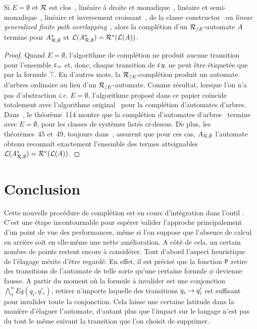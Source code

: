 \begin{theorem}
  \label{thm:regular}
  Si $E=\emptyset$ et $\mathcal R$ est clos~\cite{DauchetTison-LICS90,Brainerd-IC69}, linéaire à droite et
  monadique~\cite{Salomaa88}, linéaire et semi-monadique~\cite{CoquideDauchetGV-FCT89}, linéaire et inversement
  croissant~\cite{Jacquemard-RTA96}, de la classe constructor~\cite{Rety-LPAR99} ou \textit{linear generalized finite path
    overlapping~\cite{Takai-RTA04}}, alors la complétion d'un ${\mathcal R_{/E}}$-automate $\mathit A$ 
  termine pour $\mathit A_{\mathcal R,\emptyset}^*$ et $\mathcal{L}(\mathit A_{\mathcal R,\emptyset}^*)=\mathcal R^*(\mathcal{L}(\mathit A))$.
\end{theorem}

\begin{proof}
  Quand $E=\emptyset$, l'algorithme de complétion ne produit aucune transition
  pour l'ensemble $\upvarepsilon_{=}$ et, donc, chaque transition de $\upvarepsilon_{\mathcal R}$ ne peut être étiquetée 
  que par la formule $\top$. En d'autres mots, la ${\mathcal R_{/E}}$-complétion produit un automate d'arbres
  ordinaire au lieu d'un ${\mathcal R_{/E}}$-automate. Comme résultat, lorsque l'on n'a pas d'abstraction \textit{i.e.} $E=\emptyset$,
  l'algorithme proposé dans ce papier coïncide totalement avec l'algorithme original~\cite{GenetR-JSC10} 
  pour la complétion d'automates d'arbres. Dans~\cite{Genet-Habil}, le théorème~114 montre que
  la complétion d'automates d'arbres~\cite{GenetR-JSC10} termine avec $E=\emptyset$,
  pour les classes de systèmes listés ci-dessus. De plus, les théorèmes~45 et~49, toujours
  dans~\cite{GenetR-JSC10}, assurent que pour ces cas, $A_{\mathcal R,\emptyset}$ l'automate obtenu
  reconnaît exactement l'ensemble des termes atteignables $\mathcal{L}(\mathit A_{\mathcal R,\emptyset}^*)=\mathcal R^*(\mathcal{L}(\mathit A))$.
\end{proof}

\section{Conclusion}
Cette nouvelle procédure de complétion est en cours d'intégration dans l'outil \timbuk.
C'est une étape incontournable pour espérer valider l'approche principalement d'un point
de vue des performances, même si l'on suppose que l'absence de calcul en arrière soit
en elle-même une nette amélioration. A côté de cela, un certain nombre de points
restent encore à considérer.
Tout d'abord l'aspect heuristique de l'élagage mérite d'être regardé. En effet, 
il est précisé que la fonction $\mathtt{P}$ retire des transitions de l'automate de telle sorte
qu'une certaine formule $\phi$ devienne fausse. A partir du moment où la formule à invalider
est une conjonction $\bigwedge_1^n Eq(q_i,q'_i)$, retirer n'importe laquelle des transitions
$q_i \rightarrow q'_i$ est suffisant pour invalider toute la conjonction. Cela laisse une certaine
latitude dans la manière d'élaguer l'automate, d'autant plus que l'impact sur le langage
n'est pas du tout le même suivant la transition que l'on choisit de supprimer.

